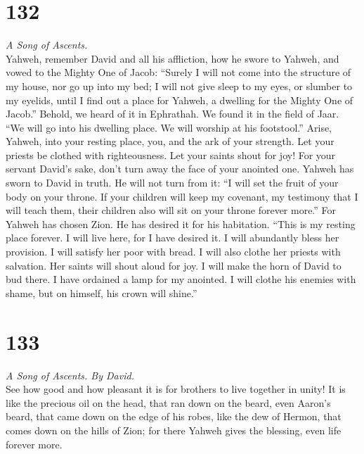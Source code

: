 \hypertarget{section-131}{%
\section{132}\label{section-131}}

\emph{A Song of Ascents.}\\
 Yahweh, remember David and all his affliction,
 how he swore to Yahweh, and vowed to the Mighty One of
Jacob:  ``Surely I will not come into the structure of my
house, nor go up into my bed;  I will not give sleep to my
eyes, or slumber to my eyelids,  until I find out a place
for Yahweh, a dwelling for the Mighty One of Jacob.'' 
Behold, we heard of it in Ephrathah. We found it in the field of Jaar.
 ``We will go into his dwelling place. We will worship at
his footstool.''  Arise, Yahweh, into your resting place,
you, and the ark of your strength.  Let your priests be
clothed with righteousness. Let your saints shout for joy!
 For your servant David's sake, don't turn away the face
of your anointed one.  Yahweh has sworn to David in
truth. He will not turn from it: ``I will set the fruit of your body on
your throne.  If your children will keep my covenant, my
testimony that I will teach them, their children also will sit on your
throne forever more.''  For Yahweh has chosen Zion. He
has desired it for his habitation.  ``This is my resting
place forever. I will live here, for I have desired it. 
I will abundantly bless her provision. I will satisfy her poor with
bread.  I will also clothe her priests with salvation.
Her saints will shout aloud for joy.  I will make the
horn of David to bud there. I have ordained a lamp for my anointed.
 I will clothe his enemies with shame, but on himself,
his crown will shine.''

\hypertarget{section-132}{%
\section{133}\label{section-132}}

\emph{A Song of Ascents. By David.}\\
 See how good and how pleasant it is for brothers to live
together in unity!  It is like the precious oil on the
head, that ran down on the beard, even Aaron's beard, that came down on
the edge of his robes,  like the dew of Hermon, that comes
down on the hills of Zion; for there Yahweh gives the blessing, even
life forever more.

